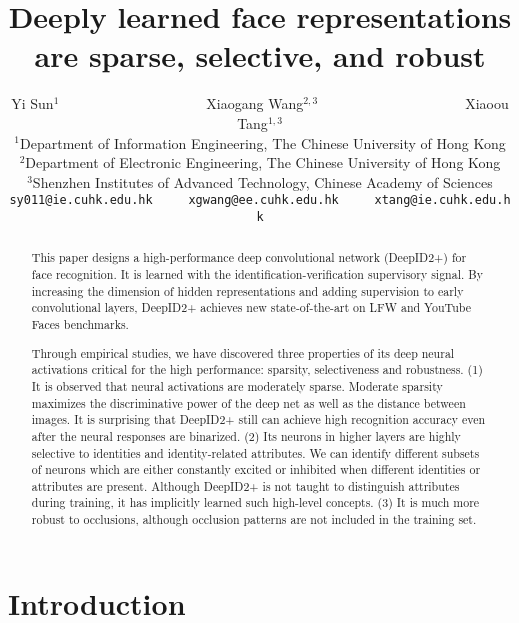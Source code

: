 \documentclass[10pt,twocolumn,letterpaper]{article}
\begin{document}
\title{Deeply learned face representations are sparse, selective, and robust}

\author{Yi Sun$^{1}$~~~~~~~~~~~~~~~~~~~~~Xiaogang Wang$^{2,3}$~~~~~~~~~~~~~~~~~~~~~Xiaoou Tang$^{1,3}$\\
{\small $^1$Department of Information Engineering, The Chinese University of Hong Kong}\\
{\small $^2$Department of Electronic Engineering, The Chinese University of Hong Kong}\\
{\small $^3$Shenzhen Institutes of Advanced Technology, Chinese Academy of Sciences}\\
{\tt\small sy011@ie.cuhk.edu.hk~~~~~xgwang@ee.cuhk.edu.hk~~~~~xtang@ie.cuhk.edu.hk}}

\maketitle

\begin{abstract}
   This paper designs a high-performance deep convolutional network (DeepID2+) for face recognition. It is learned with the identification-verification supervisory signal. By increasing the dimension of hidden representations and adding  supervision to early convolutional layers, DeepID2+ achieves new state-of-the-art on LFW  and YouTube Faces benchmarks.

    Through empirical studies, we have discovered three properties of its deep neural activations critical for the high performance: sparsity, selectiveness and robustness.  (1) It is observed that neural activations are moderately sparse. Moderate sparsity maximizes the discriminative power of the deep net as well as the distance between images. It is surprising that DeepID2+ still can achieve high recognition accuracy even after the neural responses are binarized. (2) Its neurons in higher layers are highly selective to identities and identity-related attributes. We can identify different subsets of neurons which are either constantly excited or inhibited when different identities or attributes are present.  Although  DeepID2+  is not taught to distinguish attributes during training, it has implicitly learned such high-level concepts. (3) It is much more robust to occlusions, although occlusion patterns are not included in the training set.
\end{abstract}


\section{Introduction}
\end{document}
